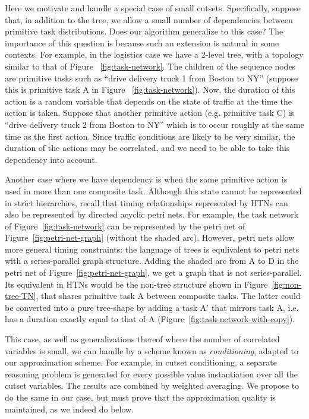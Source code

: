 \documentclass[review]{elsarticle}
\begin{document}
Here we motivate and handle a special case of small cutsets. 
Specifically, suppose that, in addition to the tree, we allow a small number of dependencies
between primitive task distributions. Does our algorithm generalize to this case?
The importance of this question is because such an extension is natural in some contexts. For example,
in the logistics case we have a 2-level tree, with a topology similar to that of Figure ~\ref{fig:task-network}.
The children of the sequence nodes are primitive tasks such as
``drive delivery truck 1 from Boston to NY'' (suppose this is primitive task A in  Figure ~\ref{fig:task-network}).
Now, the duration of this action is a random variable
that depends on the state of traffic at the time the action is taken. Suppose that another
primitive action (e.g. primitive task C) is ``drive delivery truck 2 from Boston to NY'' which is to occur roughly at the
same time as the first action. Since traffic conditions are likely to be very similar, the
duration of the actions may be correlated, and we need to be able to take
this dependency into account.

Another case where we have dependency is when the same primitive action is 
used in more than one composite task. Although this state cannot be represented in
strict hierarchies, recall that timing relationships represented by HTNs can also be
represented by directed acyclic petri nets. For example, the task network of Figure~\ref{fig:task-network}
can be represented by the petri net of Figure~\ref{fig:petri-net-graph} (without the shaded arc). However, petri nets allow more general
timing constraints: the language of trees is equlivalent to petri nets with a series-parallel
graph structure. Adding the shaded arc from A to D in the petri net of Figure~\ref{fig:petri-net-graph}, 
we get a graph that is not series-parallel. Its equivalent in HTNs would be the non-tree structure
shown in Figure~\ref{fig:non-tree-TN}, that shares primitive task A between composite tasks. 
The latter could be converted into a pure tree-shape by adding a task A' that mirrors task A,
i.e. has a duration exactly equal to that of A (Figure~\ref{fig:task-network-with-copy}).

This case, as well as generalizations thereof where the number of correlated variables is small,
we can handle by a scheme known as {\em conditioning}, adapted to our approximation scheme.
For example, in cutset conditioning, a separate reasoning problem is generated
for every possible value instantiation over all the cutset variables. The results
are combined by weighted averaging. We propose to do the same in our case, but must prove
that the approximation quality is maintained, as we indeed do below.
\end{document}
